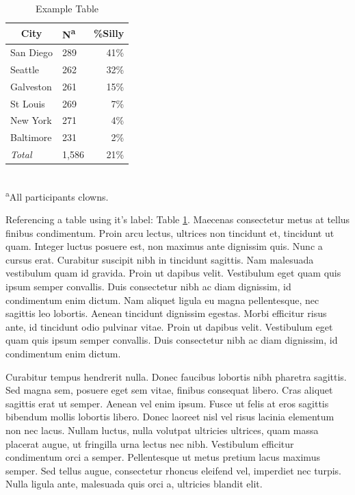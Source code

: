 \documentclass[11pt, notitlepage]{article} %
\begin{document}
\begin{table} %
	\caption{Example Table}
	\begin{center}
		\begin{tabular}{l l r}
			\toprule
			\multicolumn{1}{c}{City} & {N\textsuperscript{a}} & {\%Silly}\\
			\midrule
			San Diego & 289 & 41\%\\
			Seattle & 262 & 32\%\\
			Galveston & 261 & 15\%\\
			St Louis & 269 & 7\%\\
			New York & 271 & 4\%\\
			Baltimore & 231 & 2\%\\
			\emph{Total} & 1,586 & 21\%\\
			\hline 
		\end{tabular}\\
		\footnotesize\textsuperscript{a}{All participants clowns.}
	\end{center}
	\label{tab:example}
\end{table}

Referencing a table using it's label: Table \ref{tab:example}. Maecenas consectetur metus at tellus finibus condimentum. Proin arcu lectus, ultrices non tincidunt et, tincidunt ut quam. Integer luctus posuere est, non maximus ante dignissim quis. Nunc a cursus erat. Curabitur suscipit nibh in tincidunt sagittis. Nam malesuada vestibulum quam id gravida. Proin ut dapibus velit. Vestibulum eget quam quis ipsum semper convallis. Duis consectetur nibh ac diam dignissim, id condimentum enim dictum. Nam aliquet ligula eu magna pellentesque, nec sagittis leo lobortis. Aenean tincidunt dignissim egestas. Morbi efficitur risus ante, id tincidunt odio pulvinar vitae. Proin ut dapibus velit. Vestibulum eget quam quis ipsum semper convallis. Duis consectetur nibh ac diam dignissim, id condimentum enim dictum.

Curabitur tempus hendrerit nulla. Donec faucibus lobortis nibh pharetra sagittis. Sed magna sem, posuere eget sem vitae, finibus consequat libero. Cras aliquet sagittis erat ut semper. Aenean vel enim ipsum. Fusce ut felis at eros sagittis bibendum mollis lobortis libero. Donec laoreet nisl vel risus lacinia elementum non nec lacus. Nullam luctus, nulla volutpat ultricies ultrices, quam massa placerat augue, ut fringilla urna lectus nec nibh. Vestibulum efficitur condimentum orci a semper. Pellentesque ut metus pretium lacus maximus semper. Sed tellus augue, consectetur rhoncus eleifend vel, imperdiet nec turpis. Nulla ligula ante, malesuada quis orci a, ultricies blandit elit.
\end{document}
